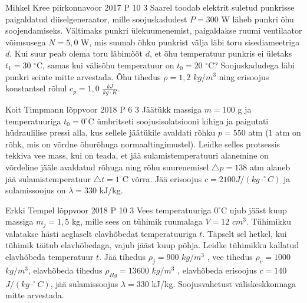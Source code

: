 \documentclass[11pt]{article}
\begin{document}
{%
{Mihkel Kree} %
{piirkonnavoor} %
{2017} %
{P 10} %
{3} %
{
\ifStatement
Saarel toodab elektrit suletud punkrisse paigaldatud diiselgeneraator, mille soojuskadudest $P = 300$ W läheb punkri õhu soojendamiseks. Vältimaks punkri ülekuumenemist, paigaldakse ruumi ventilaator võimsusega $N = 5,0$ W, mis suunab õhku punkrist välja läbi toru sisediameetriga $d$. Kui suur peab olema toru läbimõõt $d$, et õhu temperatuur punkris ei ületaks $t_1 = 30$ $^{\circ}$C, samas kui välisõhu temperatuur on $t_0 = 20$ $^{\circ}$C? Soojuskadudega läbi punkri seinte mitte arvestada. Õhu tihedus $\rho = 1,2$ $kg/m^3$ ning erisoojus konstantsel rõhul $c_p = 1,0$ $\frac{kJ}{kg \cdot K}$.
\fi
}

{Koit Timpmann} %
{lõppvoor} %
{2018} %
{P 6} %
{3} %
{
\ifStatement
Jäätükk massiga $m = 100$ g ja temperatuuriga $t_0 = 0^{\circ}$C ümbritseti soojusisolatsiooni kihiga ja paigutati hüdraulilise pressi alla, kus sellele jäätükile avaldati rõhku $p = 550$ atm ($1$ atm on rõhk, mis on võrdne õhurõhuga normaaltingimustel). Leidke selles protsessis tekkiva vee mass, kui on teada, et jää sulamistemperatuuri alanemine on võrdeline jääle avaldatud rõhuga ning rõhu suurenemisel $\triangle p = 138$ atm alaneb jää sulamistemperatuur $\triangle t = 1^{\circ}$C võrra. Jää erisoojus $c = 2100 J/(kg \cdot ^{\circ}C)$ ja sulamissoojus on $\lambda = 330$ kJ/kg.
\fi
}

{Erkki Tempel} %
{lõppvoor} %
{2018} %
{P 10} %
{3} %
{
\ifStatement
Vees temperatuuriga $0^{\circ}$C ujub jääst kuup massiga $m_j = 1,5$ kg, mille sees on tühimik ruumalaga $V = 12$ $cm^3$. Tühimikku valatakse hästi aeglaselt elavhõbedat temperatuuriga $t$. Täpselt sel hetkel, kui tühimik täitub elavhõbedaga, vajub jääst kuup põhja. Leidke tühimikku kallatud elavhõbeda temperatuur $t$. Jää tihedus $\rho_j = 900$ $kg/m^3$ , vee tihedus $\rho_v = 1000$ $kg/m^3$, elavhõbeda tihedus $\rho_{Hg} = 13 600$ $kg/m^3$ , elavhõbeda erisoojus $c = 140$ $J/(kg\cdot ^{\circ}C)$, jää sulamissoojus $\lambda = 330$ kJ/kg. Soojusvahetust väliskeskkonnaga mitte arvestada.
\fi
}
\newpage\subsection{\protect{}}

}
\end{document}
